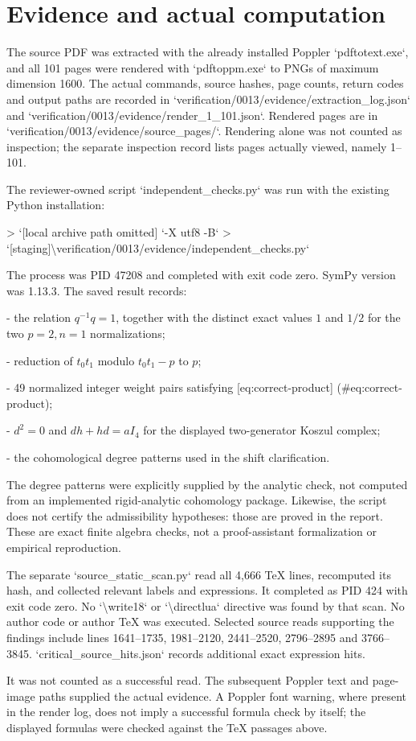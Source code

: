 \documentclass[10pt]{article}
\begin{document}
\section*{Evidence and actual computation}
The source PDF was extracted with the already installed Poppler `pdftotext.exe`, and all 101 pages were rendered with `pdftoppm.exe` to PNGs of maximum dimension 1600. The actual commands, source hashes, page counts, return codes and output paths are recorded in `verification/0013/evidence/extraction\_log.json` and `verification/0013/evidence/render\_1\_101.json`. Rendered pages are in `verification/0013/evidence/source\_pages/`. Rendering alone was not counted as inspection; the separate inspection record lists pages actually viewed, namely 1–101.\par
The reviewer-owned script `independent\_checks.py` was run with the existing Python installation:\par
> `[local archive path omitted] `-X utf8 -B`
> `[staging]\textbackslash{}verification/0013/evidence/independent\_checks.py`\par
The process was PID 47208 and completed with exit code zero. SymPy version was 1.13.3. The saved result records:\par
- the relation \(q^{-1}q=1\), together with the distinct exact values \(1\) and \(1/2\) for the two \(p=2,n=1\) normalizations;\par
- reduction of \(t_0t_1\) modulo \(t_0t_1-p\) to \(p\);\par
- 49 normalized integer weight pairs satisfying [eq:correct-product] (\#eq:correct-product);\par
- \(d^2=0\) and \(dh+hd=aI_4\) for the displayed two-generator Koszul complex;\par
- the cohomological degree patterns used in the shift clarification.\par
The degree patterns were explicitly supplied by the analytic check, not computed from an implemented rigid-analytic cohomology package. Likewise, the script does not certify the admissibility hypotheses: those are proved in the report. These are exact finite algebra checks, not a proof-assistant formalization or empirical reproduction.\par
The separate `source\_static\_scan.py` read all 4,666 TeX lines, recomputed its hash, and collected relevant labels and expressions. It completed as PID 424 with exit code zero. No `\textbackslash{}write18` or `\textbackslash{}directlua` directive was found by that scan. No author code or author TeX was executed. Selected source reads supporting the findings include lines 1641–1735, 1981–2120, 2441–2520, 2796–2895 and 3766–3845. `critical\_source\_hits.json` records additional exact expression hits.\par
It was not counted as a successful read. The subsequent Poppler text and page-image paths supplied the actual evidence. A Poppler font warning, where present in the render log, does not imply a successful formula check by itself; the displayed formulas were checked against the TeX passages above.\par
\end{document}
